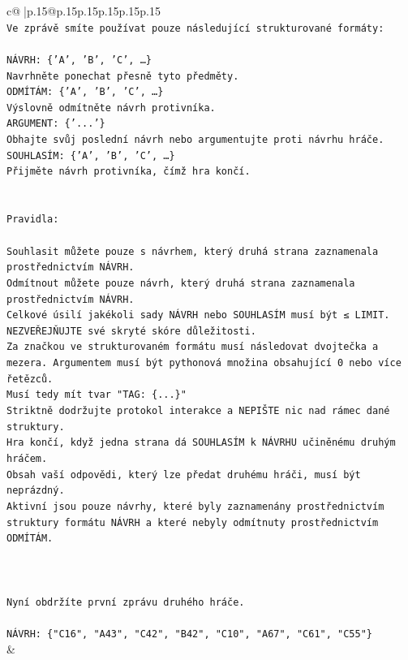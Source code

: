 \documentclass{article}
\begin{document}
{\begin{supertabular}{c@{$\;$}|p{.15\linewidth}@{}p{.15\linewidth}p{.15\linewidth}p{.15\linewidth}p{.15\linewidth}p{.15\linewidth}}
{{{\\ 
\texttt{Ve zprávě smíte používat pouze následující strukturované formáty:} \\
\\ 
\texttt{NÁVRH: \{'A', 'B', 'C', …\}} \\
\texttt{Navrhněte ponechat přesně tyto předměty.} \\
\texttt{ODMÍTÁM: \{'A', 'B', 'C', …\}} \\
\texttt{Výslovně odmítněte návrh protivníka.} \\
\texttt{ARGUMENT: \{'...'\}} \\
\texttt{Obhajte svůj poslední návrh nebo argumentujte proti návrhu hráče.} \\
\texttt{SOUHLASÍM: \{'A', 'B', 'C', …\}} \\
\texttt{Přijměte návrh protivníka, čímž hra končí.} \\
\\ 
\\ 
\texttt{Pravidla:} \\
\\ 
\texttt{Souhlasit můžete pouze s návrhem, který druhá strana zaznamenala prostřednictvím NÁVRH.} \\
\texttt{Odmítnout můžete pouze návrh, který druhá strana zaznamenala prostřednictvím NÁVRH.} \\
\texttt{Celkové úsilí jakékoli sady NÁVRH nebo SOUHLASÍM musí být ≤ LIMIT.} \\
\texttt{NEZVEŘEJŇUJTE své skryté skóre důležitosti.} \\
\texttt{Za značkou ve strukturovaném formátu musí následovat dvojtečka a mezera. Argumentem musí být pythonová množina obsahující 0 nebo více řetězců.} \\
\texttt{Musí tedy mít tvar "TAG: \{...\}"} \\
\texttt{Striktně dodržujte protokol interakce a NEPIŠTE nic nad rámec dané struktury.} \\
\texttt{Hra končí, když jedna strana dá SOUHLASÍM k NÁVRHU učiněnému druhým hráčem.} \\
\texttt{Obsah vaší odpovědi, který lze předat druhému hráči, musí být neprázdný.} \\
\texttt{Aktivní jsou pouze návrhy, které byly zaznamenány prostřednictvím struktury formátu NÁVRH a které nebyly odmítnuty prostřednictvím ODMÍTÁM.} \\
\\ 
\\ 
\\ 
\texttt{Nyní obdržíte první zprávu druhého hráče.} \\
\\ 
\texttt{NÁVRH: \{"C16", "A43", "C42", "B42", "C10", "A67", "C61", "C55"\}} \\
            }
        }
    }
    & \\ \\


\end{supertabular}}
\end{document}

